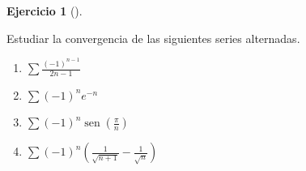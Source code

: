 \documentclass[
  a4paper,
]{scrreport}
\theoremstyle{definition}
\newtheorem{exercise}{Ejercicio}[chapter]
\theoremstyle{remark}
\begin{document}
\begin{exercise}[]\protect\hypertarget{exr-series-alternadas}{}\label{exr-series-alternadas}

Estudiar la convergencia de las siguientes series alternadas.

\begin{enumerate}
\def\labelenumi{\alph{enumi}.}
\item
  \(\sum \frac{(-1)^{n-1}}{2n-1}\)
\item
  \(\sum (-1)^ne^{-n}\)
\item
  \(\sum (-1)^n\operatorname{sen}\left(\frac{\pi}{n}\right)\)
\item
  \(\sum (-1)^n\left(\frac{1}{\sqrt{n+1}}-\frac{1}{\sqrt{n}}\right)\)
\end{enumerate}

\end{exercise}
\end{document}

